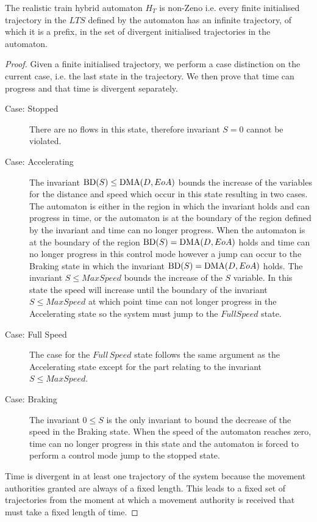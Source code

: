 \begin{mytheorem}
The realistic train hybrid automaton  $H_{T}$ is non-Zeno i.e. every finite initialised trajectory in the $LTS$ defined by the automaton has an infinite trajectory, of which it is a prefix, in the set of divergent initialised trajectories in the automaton.
\begin{proof}
Given a finite initialised trajectory, we perform a case distinction on the current case, i.e. the last state in the trajectory. We then prove that time can progress and that time is divergent separately.
\begin{description}
\item[Case: Stopped] There are no flows in this state, therefore invariant $S = 0$ cannot be violated. 

\item[Case: Accelerating] The invariant $\mathrm{BD}(S) \leq \mathrm{DMA}(D,EoA)$ bounds the increase of the variables for the distance and speed which occur in this state resulting in two cases. The automaton is either in the region in which the invariant holds and can progress in time, or the automaton is at the boundary of the region defined by the invariant and time can no longer progress. When the automaton is at the boundary of the region $\mathrm{BD}(S) = \mathrm{DMA}(D,EoA)$ holds and time can no longer progress in this control mode however a jump can occur to the Braking state in which the invariant $\mathrm{BD}(S) = \mathrm{DMA}(D,EoA)$ holds. The invariant $S \leq MaxSpeed$ bounds the increase of the $S$ variable. In this state the speed will increase until the boundary of the invariant $S \leq MaxSpeed$ at which point time can not longer progress in the Accelerating state so the system must jump to the $Full Speed$ state.


\item[Case: Full Speed] 
The case for the $Full \, Speed$ state follows the same argument as the Accelerating state except for the part relating to the invariant $S \leq MaxSpeed$.

\item[Case: Braking]
The invariant $0 \leq S$ is the only invariant to bound the decrease of the speed in the Braking state. When the speed of  the automaton reaches zero, time can no longer progress in this state and the automaton is forced to perform a control mode jump to the stopped state. 
\end{description}

Time is divergent in at least one trajectory of the system because the movement authorities granted are always of a fixed length. This leads to a fixed set of trajectories from the moment at which a movement authority is received that must take a fixed length of time.


\end{proof}
\end{mytheorem}

